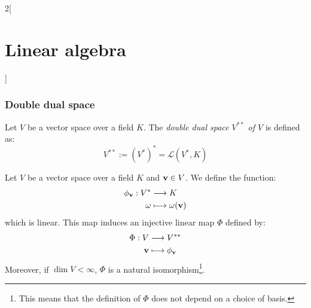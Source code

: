 \documentclass[../../../main.tex]{subfiles}
\begin{document}
\begin{multicols}{2}[\section{Linear algebra}]
  \subsubsection{Double dual space}
  \begin{definition}
    Let $V$ be a vector space over a field $K$. The \textit{double dual space $V^{**}$ of $V$} is defined as: $$V^{**}:={(V^*)}^*=\mathcal{L}(V^*,K)$$
  \end{definition}
  \begin{prop}
    Let $V$ be a vector space over a field $K$ and $\boldsymbol{\mathrm{v}}\in V$. We define the function:
    \begin{align*}
      \phi_{\boldsymbol{\mathrm{v}}}:V^* & \longrightarrow K                     \\
      \omega                        & \longmapsto\omega(\boldsymbol{\mathrm{v}})
    \end{align*}
    which is linear. This map induces an injective linear map $\Phi$ defined by:
    \begin{align*}
      \Phi:V             & \longrightarrow V^{**}               \\
      \boldsymbol{\mathrm{v}} & \longmapsto\phi_{\boldsymbol{\mathrm{v}}}
    \end{align*}
    Moreover, if $\dim V<\infty$, $\Phi$ is a natural isomorphism\footnote{This means that the definition of $\Phi$ does not depend on a choice of basis.}.
  \end{prop}

\end{multicols}
\end{document}

